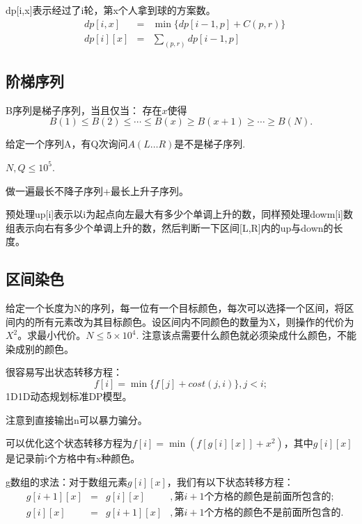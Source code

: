 \documentclass{article}
\begin{document}
dp[i,x]表示经过了i轮，第x个人拿到球的方案数。
\begin{equation*}
    \begin{aligned}
        &dp[i,x]&=&\min\{dp[i-1,p]+C(p,r)\}\\
        &dp[i][x]&=&\sum_{(p,r)} dp[i-1,p]
    \end{aligned}
\end{equation*}
\subsection{阶梯序列}
B序列是梯子序列，当且仅当：
存在$x$使得
\begin{equation*}
    B(1)\le B(2)\le\cdots\le B(x)\ge B(x+1)\ge\cdots\ge B(N).
\end{equation*}

给定一个序列A，有Q次询问$A(L\ldots R)$是不是梯子序列.

$N,Q\le 10^5$.

做一遍最长不降子序列+最长上升子序列。

预处理up[i]表示以i为起点向左最大有多少个单调上升的数，同样预处理dowm[i]数组表示向右有多少个单调上升的数，然后判断一下区间[L,R]内的up与down的长度。

\subsection{区间染色}
给定一个长度为N的序列，每一位有一个目标颜色，每次可以选择一个区间，将区间内的所有元素改为其目标颜色。设区间内不同颜色的数量为X，则操作的代价为$X^2$。求最小代价。$N\le 5\times 10^4.$ 注意该点需要什么颜色就必须染成什么颜色，不能染成别的颜色。

很容易写出状态转移方程：
\begin{equation*}
    f[i]=\min\{f[j]+cost(j,i)\},j<i;
\end{equation*}
1D1D动态规划标准DP模型。

注意到直接输出n可以暴力骗分。

可以优化这个状态转移方程为$f[i]=\min(f[g[i][x]]+x^2)$，其中$g[i][x]$是记录前i个方格中有x种颜色。

g数组的求法：对于数组元素$g[i][x]$，我们有以下状态转移方程：
\begin{equation*}
    \begin{aligned}
        &g[i+1][x]&=&g[i][x]&,第i+1个方格的颜色是前面所包含的;\\
        &g[i][x]&=&g[i+1][x]&,第i+1个方格的颜色不是前面所包含的.
    \end{aligned}
\end{equation*}
\end{document}
